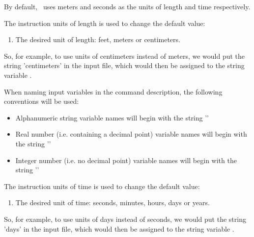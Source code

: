 \label{texfile:Units}
By default, \mut\ uses meters and seconds as the units of length and time respectively.  

The instruction \textsf{units of length} is used to change the default value:

    {
        \squish
        \begin{enumerate}
        \item {}  The desired unit of length: feet, meters or centimeters.
        \end{enumerate}
        
        So, for example, to use units of centimeters instead of meters, we would put the string 'centimeters' in the input file, which would then be assigned to the string variable .
    }

When naming input variables in the command description, the following conventions will be used:
\begin{itemize}
    \item Alphanumeric string variable names will begin with
    the string '\str{}'
    \item Real number (i.e. containing a decimal point) variable names will begin with
    the string '\rnum{}'
    \item Integer number (i.e. no decimal point) variable names will begin with
    the string '\inum{}'
\end{itemize}

The instruction \textsf{units of time} is used to change the default value:

    {
        \squish
        \begin{enumerate}
        \item {}  The desired unit of time: seconds, minutes, hours, days or years.
        \end{enumerate}

        So, for example, to use units of days instead of seconds, we would put the string 'days' in the input file, which would then be assigned to the string variable .
    }



